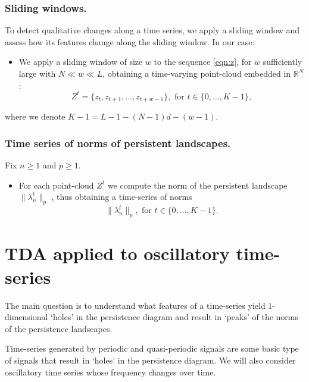 \documentclass[11pt]{amsart}
\theoremstyle{definition}
\theoremstyle{remark}
\numberwithin{equation}{section}
\def\R{\mathbb{R}}
\begin{document}
\subsubsection{Sliding windows.}
To detect qualitative changes along a time series, we apply a sliding window %
and assess how its features change  along the sliding window. In our case:
\begin{itemize}
\item We apply  a sliding window of size $w$ to the sequence \eqref{eqn:z}, for $w$ sufficiently large with $N\ll w\ll L$,  obtaining a   time-varying
    point-cloud embedded in  $\mathbb{R}^N$:
\begin{equation}\label{eqn:Z}
Z^t=\{z_t,z_{t+1},\ldots, z_{t+w-1}\}, \textrm { for } t\in\{0,\ldots,K-1\},\end{equation}
\end{itemize}
where we denote $K-1=L-1-(N-1)d-(w-1)$.


\subsubsection{Time series of norms of persistent landscapes.}
Fix $n\geq 1$ and $p\geq 1$.
\begin{itemize}
\item For each point-cloud $Z^t$ we compute the norm of the persistent landscape $\|\lambda ^t_n\|_p$ , thus obtaining a time-series of norms
\[ \|\lambda ^t_n\|_p,  \textrm { for } t\in\{0,\ldots, K-1\}.\]
\end{itemize}


\section{TDA applied to oscillatory time-series}
\label{sec:TDA_quasi}
The main question is  to understand what features of a time-series yield $1$-dimensional `holes' in the persistence diagram and
result in `peaks' of the norms of the persistence landscapes.

Time-series generated by periodic and quasi-periodic signals are some basic type of signals that result in  `holes' in the persistence diagram.
We will also consider oscillatory time series whose frequency changes over time.
\end{document}
